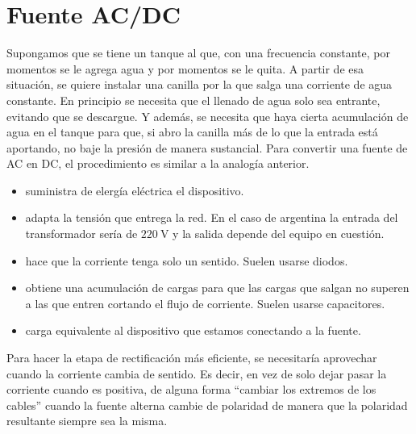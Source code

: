 \documentclass[a5paper,12pt,twoside]{book}
\begin{document}
\section{Fuente AC/DC}

Supongamos que se tiene un tanque al que, con una frecuencia constante, por momentos se le agrega agua y por momentos se le quita. A partir de esa situación, se quiere instalar una canilla por la que salga una corriente de agua constante. En principio se necesita que el llenado de agua solo sea entrante, evitando que se descargue. Y además, se necesita que haya cierta acumulación de agua en el tanque para que, si abro la canilla más de lo que la entrada está aportando, no baje la presión de manera sustancial. Para convertir una fuente de AC en DC, el procedimiento es similar a la analogía anterior.

\begin{itemize}
    \item {} suministra de elergía eléctrica el dispositivo.
    \item {} adapta la tensión que entrega la red. En el caso de argentina la entrada del transformador sería de $\SI{220}{\volt}$ y la salida depende del equipo en cuestión.
    \item {} hace que la corriente tenga solo un sentido. Suelen usarse diodos.
    \item {} obtiene una acumulación de cargas para que las cargas que salgan no superen a las que entren cortando el flujo de corriente. Suelen usarse capacitores.
    \item {} carga equivalente al dispositivo que estamos conectando a la fuente.
\end{itemize}

\begin{center}
    \def\svgwidth{\linewidth}
    
\end{center}


Para hacer la etapa de rectificación más eficiente, se necesitaría aprovechar cuando la corriente cambia de sentido. Es decir, en vez de solo dejar pasar la corriente cuando es positiva, de alguna forma ``cambiar los extremos de los cables'' cuando la fuente alterna cambie de polaridad de manera que la polaridad resultante siempre sea la misma.

\begin{center}
    \def\svgwidth{0.6\linewidth}
    
\end{center}
\end{document}
